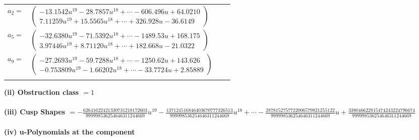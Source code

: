 \documentclass[1p]{elsarticle_modified}
\theoremstyle{definition}
\begin{document}
\begin{tabular}{m{7pt} m{180pt} m{7pt} m{180pt} }
\flushright $a_{2}=$&$\begin{pmatrix}-13.1542 u^{19}-28.7857 u^{18}+\cdots-606.496 u+64.0210\\7.11259 u^{19}+15.5565 u^{18}+\cdots+326.928 u-36.6149\end{pmatrix}$ \\
\flushright $a_{5}=$&$\begin{pmatrix}-32.6380 u^{19}-71.5392 u^{18}+\cdots-1489.53 u+168.175\\3.97446 u^{19}+8.71120 u^{18}+\cdots+182.668 u-21.0322\end{pmatrix}$ \\
\flushright $a_{9}=$&$\begin{pmatrix}-27.2693 u^{19}-59.7288 u^{18}+\cdots-1250.62 u+143.626\\-0.753809 u^{19}-1.66202 u^{18}+\cdots-33.7724 u+2.85889\end{pmatrix}$\\&\end{tabular}
\flushleft \textbf{(ii) Obstruction class $= 1$}\\~\\
\flushleft \textbf{(iii) Cusp Shapes $= -\frac{62641622421330731218172603}{999998536254646311244669} u^{19}-\frac{137124516846403670777326513}{999998536254646311244669} u^{18}+\cdots-\frac{2878152757722006579821255122}{999998536254646311244669} u+\frac{338046622815474243224796674}{999998536254646311244669}$}\\~\\
\newpage\renewcommand{\arraystretch}{1}
\flushleft \textbf{(iv) u-Polynomials at the component}\newline \\
\end{document}
